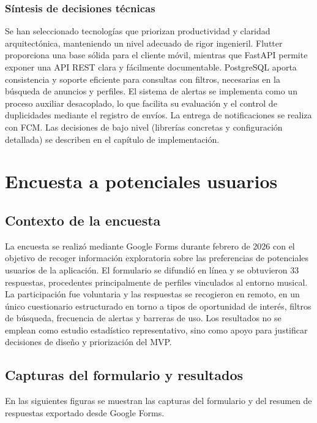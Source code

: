 \documentclass[12pt,a4paper]{report}
\begin{document}
\subsection{Síntesis de decisiones técnicas}
Se han seleccionado tecnologías que priorizan productividad y claridad arquitectónica, manteniendo un nivel adecuado de rigor ingenieril. Flutter proporciona una base sólida para el cliente móvil, mientras que FastAPI permite exponer una API REST clara y fácilmente documentable. PostgreSQL aporta consistencia y soporte eficiente para consultas con filtros, necesarias en la búsqueda de anuncios y perfiles. El sistema de alertas se implementa como un proceso auxiliar desacoplado, lo que facilita su evaluación y el control de duplicidades mediante el registro de envíos. La entrega de notificaciones se realiza con FCM. Las decisiones de bajo nivel (librerías concretas y configuración detallada) se describen en el capítulo de implementación.

\appendix

\chapter{Encuesta a potenciales usuarios}
\label{anexo:encuesta}

\section{Contexto de la encuesta}
La encuesta se realizó mediante Google Forms durante febrero de 2026 con el objetivo de recoger información exploratoria sobre las preferencias de potenciales usuarios de la aplicación. El formulario se difundió en línea y se obtuvieron 33 respuestas, procedentes principalmente de perfiles vinculados al entorno musical. La participación fue voluntaria y las respuestas se recogieron en remoto, en un único cuestionario estructurado en torno a tipos de oportunidad de interés, filtros de búsqueda, frecuencia de alertas y barreras de uso. Los resultados no se emplean como estudio estadístico representativo, sino como apoyo para justificar decisiones de diseño y priorización del MVP.

\section{Capturas del formulario y resultados}
En las siguientes figuras se muestran las capturas del formulario y del resumen de respuestas exportado desde Google Forms.
\end{document}
